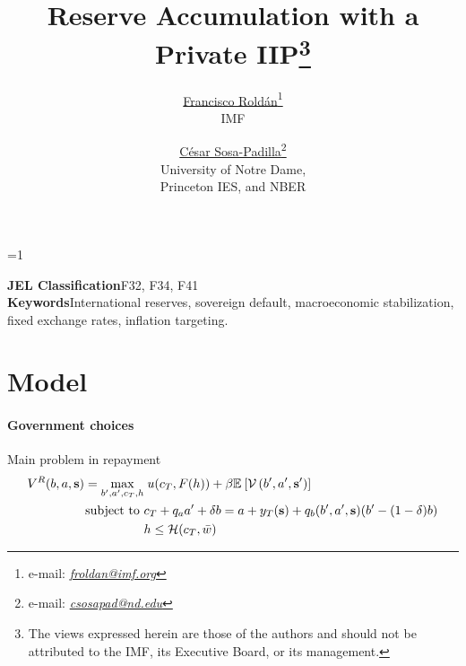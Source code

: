 
\linespread{1.32} %

\def\acknowledgements{}

\title{Reserve Accumulation with a Private IIP\thanks{The views expressed herein are those of the authors and should not be attributed to the IMF, its Executive Board, or its management. \acknowledgements}}

\author{\href{https://fqroldan.github.io}{Francisco Rold\'{a}n}\thanks{e-mail: \href{mailto:froldan@imf.org}{\emph{froldan@imf.org}}}\\IMF \and \href{https://sosapadilla.github.io}{C\'{e}sar Sosa-Padilla}\thanks{e-mail: \href{mailto:csosapad@nd.edu}{\emph{csosapad@nd.edu}}} \\University of Notre Dame,\\ Princeton IES, and NBER}

\ifdefined\ungated
\else
\def\ungated{1}
\fi

\date{\monthname\xspace \the\year %
}


\ifnum\ungated=1%
	\maketitle 
	\begin{abstract}
		\noindent
	\end{abstract}
	\vfill
	\noindent\textbf{JEL Classification}\quad F32, F34, F41\\
	\noindent\textbf{Keywords}\quad International reserves, sovereign default, macroeconomic stabilization, fixed exchange rates, inflation targeting.
	\bigskip
	\vfill
\else
	
	\tableofcontents
\fi
\pagebreak 


\section{Model}

\paragraph{Government choices}

Main problem in repayment
\begin{align}
	V^R(b,a,\text{\textbf{s}}) = \max_{b',a',c_T, h} &\; u(c_T, F(h)) + \beta \mathbb{E}_{{}}\left[ \mathcal{V}\left(b',a',\text{\textbf{s}}'\right) \right] \\
	\text{subject to }
	& c_T + q_a a' + \delta b = a + y_T(\text{\textbf{s}}) + q_b(b',a',\text{\textbf{s}}) (b' - (1-\delta) b) \notag\\
	& h \leq \mathcal{H}(c_T, \bar{w}) \notag
\end{align}

